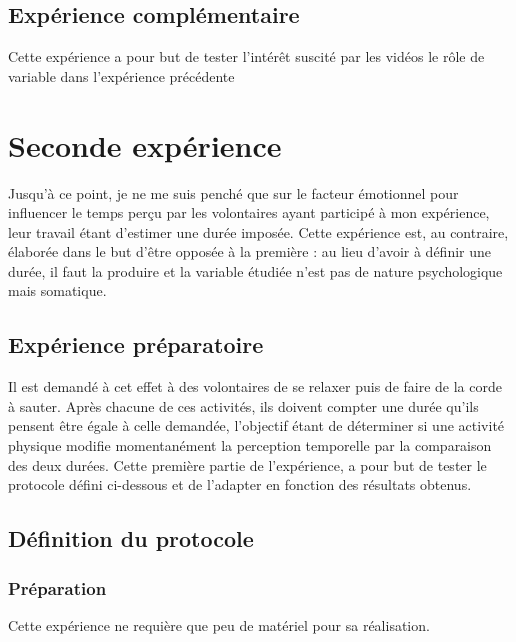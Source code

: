 \documentclass[12pt,fleqn,oneside,openany]{book} %
\begin{document}
\subsection{Expérience complémentaire} \label{ssec:exp2.2}
Cette expérience a pour but de tester l'intérêt suscité par les vidéos le rôle de variable dans l'expérience précédente

\newpage
\section{Seconde expérience} \label{sec:exp2}
Jusqu'à ce point, je ne me suis penché que sur le facteur émotionnel pour influencer le temps perçu par les volontaires ayant participé à mon expérience, leur travail étant d'estimer une durée imposée. Cette expérience est, au contraire, élaborée dans le but d'être opposée à la première : au lieu d'avoir à définir une durée, il faut la produire et la variable étudiée n'est pas de nature psychologique mais somatique.
\subsection{Expérience préparatoire} \label{ssec:but2.1}
Il est demandé à cet effet à des volontaires de se relaxer puis de faire de la corde à sauter. Après chacune de ces activités, ils doivent compter une durée qu'ils pensent être égale à celle demandée, l'objectif étant de déterminer si une activité physique modifie momentanément la perception temporelle par la comparaison des deux durées. Cette première partie de l'expérience, a pour but de tester le protocole défini ci-dessous et de l'adapter en fonction des résultats obtenus.

\subsection{Définition du protocole} \label{ssec:defProto2.1}

\subsubsection{Préparation} \label{sssec:preparation2.1}
Cette expérience ne requière que peu de matériel pour sa réalisation.
\end{document}
